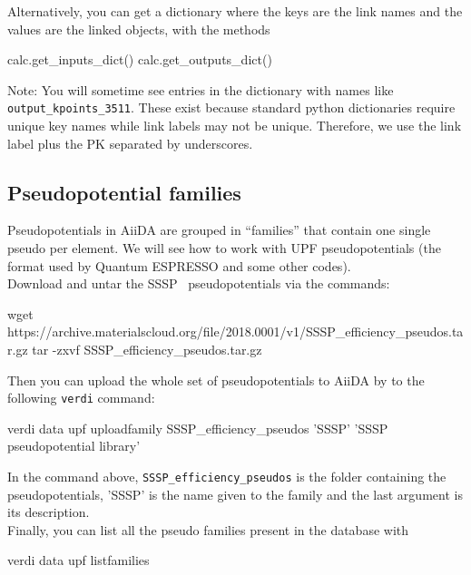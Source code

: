 Alternatively, you can get a dictionary where the keys are the link names and the values are the linked objects, with the methods
\begin{pythoncommand}
 calc.get_inputs_dict()
 calc.get_outputs_dict()
\end{pythoncommand}

Note: You will sometime see entries in the dictionary with names like \texttt{output\_kpoints\_3511}.  These exist because standard python dictionaries require unique key names while link labels may not be unique. Therefore, we use the link label plus the PK separated by underscores.



\subsection{Pseudopotential families}

Pseudopotentials in AiiDA are grouped in ``families'' that contain one
single pseudo per element. We will see how to work with UPF pseudopotentials (the format used by Quantum ESPRESSO and some other codes).\\
Download and untar the SSSP~\cite{ref:SSSP} pseudopotentials via the
commands:
\begin{bashcommand}
 wget https://archive.materialscloud.org/file/2018.0001/v1/SSSP_efficiency_pseudos.tar.gz
 tar -zxvf SSSP_efficiency_pseudos.tar.gz
\end{bashcommand}
Then you can upload the whole set of pseudopotentials to AiiDA by to the following
\texttt{verdi} command:
\begin{bashcommand}
verdi data upf uploadfamily SSSP_efficiency_pseudos 'SSSP' 'SSSP pseudopotential library'
\end{bashcommand}
In the command above, \texttt{SSSP\_efficiency\_pseudos} is the folder containing the pseudopotentials, 'SSSP' is the name given to the family and the last
argument is its description.\\
Finally, you can list all the pseudo families present in the database with
\begin{bashcommand}
 verdi data upf listfamilies
\end{bashcommand}

